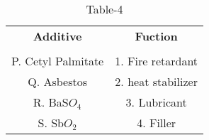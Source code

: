 \begin{table}[htbp]
  \centering
  \caption{Table-4}
  \label{table4}
  \begin{tabular}{cc}
  \textbf{Additive} & \textbf{Fuction} \\ \\
    P. Cetyl Palmitate & 1. Fire retardant \\
    Q. Asbestos & 2. heat stabilizer\\
    R. BaS$O_4$ & 3. Lubricant \\
    S. Sb$O_2$ & 4. Filler \\
  \end{tabular}
\end{table}